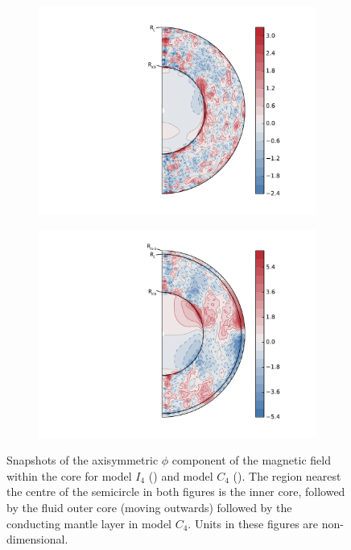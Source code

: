 \begin{figure}
	\centering
	\begin{subfigure}{.4\textwidth}
		\centering
	        \includegraphics[width=\linewidth]{Chapter5/Figures/btor10_004_1800.pdf}
     		
		\caption{\label{fig:nofesbax}}
        \end{subfigure}%
        \begin{subfigure}{.4\textwidth}
	        \centering
	        \includegraphics[width=\linewidth]{Chapter5/Figures/btor11_004_1631.pdf}
	       
	        \caption{ \label{fig:fesbax}}
        \end{subfigure}
        \caption{Snapshots of the axisymmetric $\phi$ component of the magnetic field within the core for model $I_{4}$ () and model $C_{4}$ (). The region nearest the centre of the semicircle in both figures is the inner core, followed by the fluid outer core (moving outwards) followed by the conducting mantle layer in model $C_4$. Units in these figures are non-dimensional.}
\end{figure}
